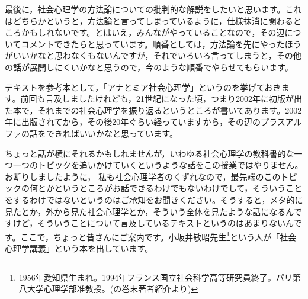\documentclass{ltjsbook}
\begin{document}
最後に，社会心理学の方法論についての批判的な解説をしたいと思います。これはどちらかというと，方法論と言ってしまっているように，仕様抹消に関わるところかもしれないです。とはいえ，みんながやっていることなので，その辺についてコメントできたらと思っています。順番としては，方法論を先にやったほうがいいかなと思わなくもないんですが，それでいろいろ言ってしまうと，その他の話が展開しにくいかなと思うので，今のような順番でやらせてもらいます。

テキストを参考本として，「アナとミア社会心理学」というのを挙げておきます\parencite{anatomia}。前回も言及しましたけれども，21世紀になった頃，つまり2002年に初版が出た本で，それまでの社会心理学を振り返るというところが書いてあります。2002年に出版されてから，その後20年ぐらい経っていますから，その辺のプラスアルファの話をできればいいかなと思っています。

ちょっと話が横にそれるかもしれませんが，いわゆる社会心理学の教科書的な一つ一つのトピックを追いかけていくというような話をこの授業ではやりません。お断りしましたように，
私も社会心理学者のくずれなので，最先端のこのトピックの何とかというところがお話できるわけでもないわけでして，そういうことをするわけではないというのはご承知をお聞きください。そうすると，メタ的に見たとか，外から見た社会心理学とか，そういう全体を見たような話になるんですけど，そういうことについて言及しているテキストというのはあまりないんです。ここで，ちょっと皆さんにご案内です。小坂井敏昭先生\footnote{1956年愛知県生まれ。1994年フランス国立社会科学高等研究員終了。パリ第八大学心理学部准教授。(\textcite{kosakai}の巻末著者紹介より)}という人が「社会心理学講義」という本を出しています\parencite{kosakai}。
\end{document}
